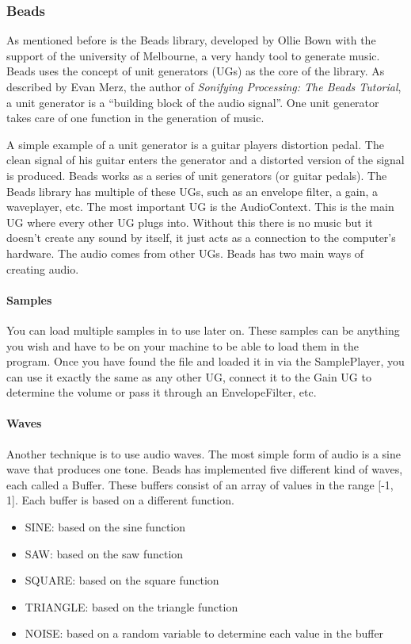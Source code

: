 \documentclass[12pt]{article}
\begin{document}
\subsubsection{Beads}
As mentioned before is the Beads library, developed by Ollie Bown with the support of the university of Melbourne, a very handy tool to generate music. Beads uses the concept of unit generators (UGs) as the core of the library. As described by Evan Merz, the author of \textit{Sonifying Processing: The Beads Tutorial}, a unit generator is a ``building block of the audio signal''.  One unit generator takes care of one function in the generation of music. 

A simple example of a unit generator is a guitar players distortion pedal. The clean signal of his guitar enters the generator and a distorted version of the signal is produced. Beads works as a series of unit generators (or guitar pedals).
\newline
\newline
The Beads library has multiple of these UGs, such as an envelope filter, a gain, a waveplayer, etc. The most important UG is the AudioContext. This is the main UG where every other UG plugs into. Without this there is no music but it doesn't create any sound by itself, it just acts as a connection to the computer's hardware. The audio comes from other UGs.
\newline
\newline
Beads has two main ways of creating audio.

\paragraph{Samples}

You can load multiple samples in to use later on. These samples can be anything you wish and have to be on your machine to be able to load them in the program. Once you have found the file and loaded it in via the SamplePlayer, you can use it exactly the same as any other UG, connect it to the Gain UG to determine the volume or pass it through an EnvelopeFilter, etc.  

\paragraph{Waves}

Another technique is to use audio waves. The most simple form of audio is a sine wave that produces one tone. Beads has implemented five different kind of waves, each called a Buffer. These buffers consist of an array of values in the range [-1, 1]. Each buffer is based on a different function.
\begin{itemize}
\item SINE:  based on the sine function
\item SAW: based on the saw function
\item SQUARE: based on the square function
\item TRIANGLE: based on the triangle function
\item NOISE: based on a random variable to determine each value in the buffer
\end{itemize} 
\end{document}
